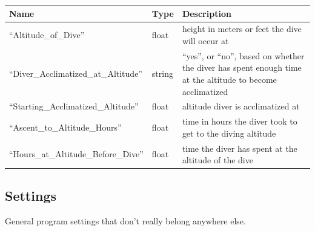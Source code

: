 \documentclass[12pt]{article}
\begin{document}
\begin{longtable}{|l|l|p{5cm}|}
\hline
 Name                                   &  Type    &  Description                                                                                                  \\
\hline
 ``Altitude\_of\_Dive''                 &  float   &  height in meters or feet the dive will occur at                                                              \\
\hline
 ``Diver\_Acclimatized\_at\_Altitude''  &  string  &  ``yes'', or ``no'', based on whether the diver has spent enough time at the altitude to become acclimatized  \\
\hline
 ``Starting\_Acclimatized\_Altitude''   &  float   &  altitude diver is acclimatized at                                                                            \\
\hline
 ``Ascent\_to\_Altitude\_Hours''        &  float   &  time in hours the diver took to get to the diving altitude                                                   \\
\hline
 ``Hours\_at\_Altitude\_Before\_Dive''  &  float   &  time the diver has spent at the altitude of the dive                                                         \\
\hline
\end{longtable}


\subsection{Settings}

General program settings that don't really belong anywhere else.
\end{document}
